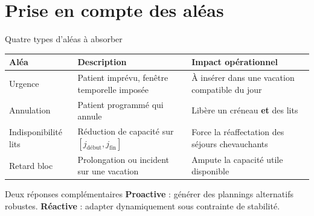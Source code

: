 \section{Prise en compte des aléas}

\begin{frame}{Quatre types d'aléas à absorber}
  \small
  \renewcommand{\arraystretch}{1.3}
  \begin{tabular}{p{3.0cm}p{5.3cm}p{4.5cm}}
    \toprule
    \textbf{Aléa} & \textbf{Description} & \textbf{Impact opérationnel} \\
    \midrule
    Urgence & Patient imprévu, fenêtre temporelle imposée
      & À insérer dans une vacation compatible du jour \\
    Annulation & Patient programmé qui annule
      & Libère un créneau \textbf{et} des lits \\
    Indisponibilité lits & Réduction de capacité sur
      $[j_{\text{début}}, j_{\text{fin}}]$
      & Force la réaffectation des séjours chevauchants \\
    Retard bloc & Prolongation ou incident sur une vacation
      & Ampute la capacité utile disponible \\
    \bottomrule
  \end{tabular}

  \vspace{0.3cm}
  \begin{alertblock}{Deux réponses complémentaires}
    \small \textbf{Proactive} : générer des plannings alternatifs robustes.
    \textbf{Réactive} : adapter dynamiquement sous contrainte de stabilité.
  \end{alertblock}
\end{frame}

